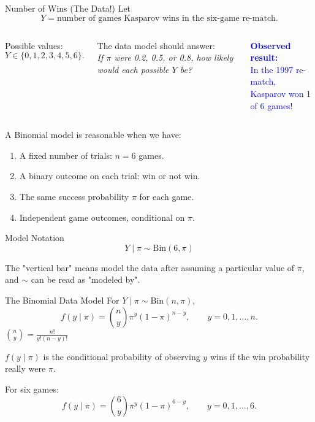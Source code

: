 \documentclass[12pt]{beamer}
\begin{document}
\begin{frame}{}
\begin{block}{Number of Wins (The Data!)}
Let
\[
Y = \text{number of games Kasparov wins in the six-game re-match.}
\]
\end{block}

\begin{columns}[T,onlytextwidth]
Possible values:
\[
Y \in \{0,1,2,3,4,5,6\}.
\]

The data model should answer:\\
\textit{
If $\pi$ were 0.2, 0.5, or 0.8, how likely would each possible $Y$ be?
}

\pause
\textcolor{blue}{
\textbf{Observed result:}\\
In the 1997 re-match,\\Kasparov won 1 of 6 games!}
\end{columns}
\end{frame}

\begin{frame}{}
A Binomial model is reasonable when we have:
\begin{enumerate}
\item A fixed number of trials: $n=6$ games.
\item A binary outcome on each trial: win or not win.
\item The same success probability $\pi$ for each game.
\item Independent game outcomes, conditional on $\pi$.
\end{enumerate}

\pause
\begin{block}{Model Notation}
\[
Y \mid \pi \sim \text{Bin}(6,\pi)
\]
\end{block}

The "vertical bar" means \alert{model the data after assuming a particular value of $\pi$,}
and \alert{$\sim$ can be read as "modeled by".}
\end{frame}

\begin{frame}{}
\begin{block}{The Binomial Data Model}
For $Y\mid\pi \sim \text{Bin}(n,\pi)$,
\[
f(y\mid\pi)=\binom{n}{y}\pi^y(1-\pi)^{n-y}, \qquad y=0,1,\ldots,n.
\]
$\binom{n}{y} = \frac{n!}{y!(n-y)!}$


\vspace{.3cm}
$f(y\mid\pi)$ is the conditional probability of observing $y$ wins if the win probability really were $\pi$.

\vspace{.3cm}
For six games:
\[
f(y\mid\pi)=\binom{6}{y}\pi^y(1-\pi)^{6-y}, \qquad y=0,1,\ldots,6.
\]
\end{block}
\end{frame}
\end{document}
